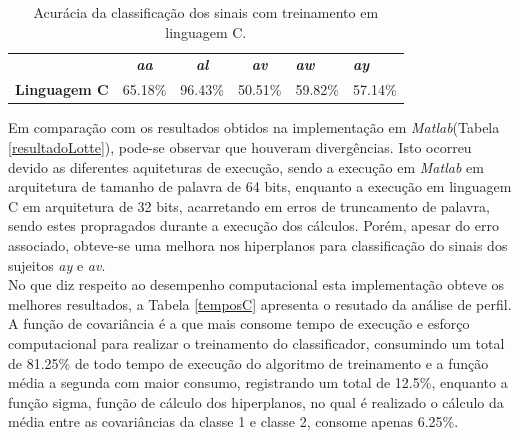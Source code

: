 \begin{table}[!h]
	\centering
	\caption{Acurácia da classificação dos sinais com treinamento em linguagem C.}
	\label{acuraciaC}
	
	\begin{tabular}{lcccll}
		\rowcolor[HTML]{DAE8FC} 
		\multicolumn{1}{c}{\cellcolor[HTML]{DAE8FC}\textbf{Sistema}} & \textit{\textbf{aa}}        & \textit{\textbf{al}}        & \textit{\textbf{av}}        & \textit{\textbf{aw}} & \textit{\textbf{ay}} \\
		\textbf{Linguagem C}                                        & \multicolumn{1}{r}{65.18\%} & \multicolumn{1}{r}{96.43\%} & \multicolumn{1}{r}{50.51\%} & 59.82\%              & 57.14\%             
	\end{tabular}
\end{table}

Em comparação com os resultados obtidos na implementação em \textit{Matlab}(Tabela \ref{resultadoLotte}), pode-se observar que houveram divergências. Isto ocorreu devido as diferentes aquiteturas de execução, sendo a execução em \textit{Matlab} em arquitetura de tamanho de palavra de 64 bits, enquanto a execução em linguagem C em arquitetura de 32 bits, acarretando em erros de truncamento de palavra, sendo estes propragados durante a execução dos cálculos. Porém, apesar do erro associado, obteve-se uma melhora nos hiperplanos para classificação do sinais dos sujeitos \textit{ay} e \textit{av}.\\

No que diz respeito ao desempenho computacional esta implementação obteve os melhores resultados, a Tabela \ref{temposC} apresenta o resutado da análise de perfil. A função de covariância é a que mais consome tempo de execução e esforço computacional para realizar o treinamento do classificador, consumindo um total de 81.25\% de todo tempo de execução do algoritmo de treinamento e a função média a segunda com maior consumo, registrando um total de 12.5\%, enquanto a função sigma, função de cálculo dos hiperplanos, no qual é realizado o cálculo da média entre as covariâncias da classe 1 e classe 2, consome apenas 6.25\%.\\


